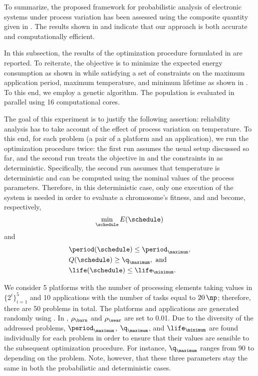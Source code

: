 To summarize, the proposed framework for probabilistic analysis of electronic
systems under process variation has been assessed using the composite quantity
given in . The results shown in
 and  indicate
that our approach is both accurate and computationally efficient.


In this subsection, the results of the optimization procedure formulated in
 are reported. To reiterate, the objective
is to minimize the expected energy consumption as shown in
 while satisfying a set of constraints on the
maximum application period, maximum temperature, and minimum lifetime as shown
in . To this end, we employ a genetic
algorithm. The population is evaluated in parallel using 16 computational cores.

The goal of this experiment is to justify the following assertion: reliability
analysis has to take account of the effect of process variation on temperature.
To this end, for each problem (a pair of a platform and an application), we run
the optimization procedure twice: the first run assumes the usual setup
discussed so far, and the second run treats the objective in
 and the constraints in
 as deterministic. Specifically, the second
run assumes that temperature is deterministic and can be computed using the
nominal values of the process parameters. Therefore, in this deterministic case,
only one execution of the system is needed in order to evaluate a chromosome's
fitness, and  and
 become, respectively,
\[
    \min_{\schedule} E(\schedule)
\]
and
\begin{align*}
  & \period(\schedule) \leq \period_\maximum, \\
  & Q(\schedule) \geq \q_\maximum, \text{ and} \\
  & \life(\schedule) \leq \life_\minimum.
\end{align*}

We consider 5 platforms with the number of processing elements \np taking values
in $\{ 2^i \}_{i = 1}^5$ and 10 applications with the number of tasks \nt equal
to $20 \, \np$; therefore, there are 50 problems in total. The platforms and
applications are generated randomly using  \cite{dick1998}. In
, $\rho_\burn$ and $\rho_\wear$ are set to
0.01. Due to the diversity of the addressed problems, $\period_\maximum$,
$\q_\maximum$, and $\life_\minimum$ are found individually for each problem in
order to ensure that their values are sensible to the subsequent optimization
procedure. For instance, $\q_\maximum$ ranges from 90 to  depending
on the problem. Note, however, that these three parameters stay the same in both
the probabilistic and deterministic cases.

